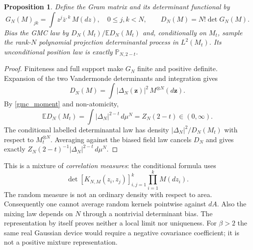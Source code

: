 \documentclass[11pt]{article}
\newtheorem{proposition}[theorem]{Proposition}
\theoremstyle{remark}\newtheorem{remark}[theorem]{Remark}
\newcommand{\E}{\mathbb E}
\newcommand{\Pp}{\mathbb P}
\begin{document}
\begin{proposition}\label{mixture}
Define the Gram matrix and its determinant functional by
\[
 G_N(M)_{jk}=\int z^j\overline z^{,k}\,M(dz),\quad 0\le j,k<N,
 \qquad D_N(M)=N!\det G_N(M).
\]
Bias the GMC law by $D_N(M_t)/\E D_N(M_t)$ and, conditionally on $M_t$,
sample the rank-$N$ polynomial projection determinantal process in
$L^2(M_t)$. Its unconditional position law is exactly $\Pp_{N,2-t}$.
\end{proposition}
\begin{proof}
Finiteness and full support make $G_N$ finite and positive definite.
Expansion of the two Vandermonde determinants and integration gives
\[
 D_N(M)=\int|\Delta_N(\mathbf z)|^2\,M^{\otimes N}(d\mathbf z).
\]
By \eqref{gmc_moment} and non-atomicity,
\[
 \E D_N(M_t)=\int|\Delta_N|^{2-t}\,d\mu^N=Z_N(2-t)\in(0,\infty).
\]
The conditional labelled determinantal law has density
$|\Delta_N|^2/D_N(M_t)$ with respect to $M_t^{\otimes N}$. Averaging
against the biased field law cancels $D_N$ and gives exactly
$Z_N(2-t)^{-1}|\Delta_N|^{2-t}\,d\mu^N$.
\end{proof}

This is a mixture of \emph{correlation measures}: the conditional formula uses
\[
 \det[K_{N,M}(z_i,z_j)]_{i,j=1}^k\prod_{i=1}^kM(dz_i).
\]
The random measure is not an ordinary density with respect to area.
Consequently one cannot average random kernels pointwise against $dA$.
Also the mixing law depends on $N$ through a nontrivial determinant bias.
The representation by itself proves neither a local limit nor uniqueness.
For $\beta>2$ the same real Gaussian device would require a negative
covariance coefficient; it is not a positive mixture representation.
\end{document}
